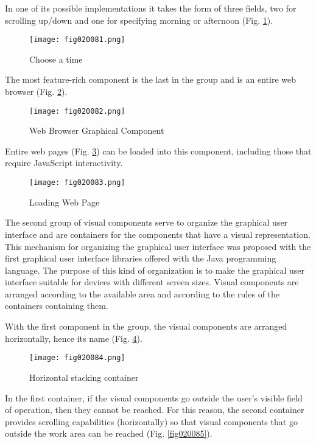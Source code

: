 In one of its possible implementations it takes the form of three fields, two for scrolling up/down and one for specifying morning or afternoon (Fig. \ref{fig020081}).

\begin{figure}[H]
   \centering
   \texttt{[image: fig020081.png]}
   \caption{Choose a time}
\label{fig020081}
\end{figure}

The most feature-rich component is the last in the group and is an entire web browser (Fig. \ref{fig020082}).

\begin{figure}[H]
   \centering
   \texttt{[image: fig020082.png]}
   \caption{Web Browser Graphical Component}
\label{fig020082}
\end{figure}

Entire web pages (Fig. \ref{fig020083}) can be loaded into this component, including those that require JavaScript interactivity.

\begin{figure}[H]
   \centering
   \texttt{[image: fig020083.png]}
   \caption{Loading Web Page}
\label{fig020083}
\end{figure}

The second group of visual components serve to organize the graphical user interface and are containers for the components that have a visual representation. This mechanism for organizing the graphical user interface was proposed with the first graphical user interface libraries offered with the Java programming language. The purpose of this kind of organization is to make the graphical user interface suitable for devices with different screen sizes. Visual components are arranged according to the available area and according to the rules of the containers containing them.

With the first component in the group, the visual components are arranged horizontally, hence its name (Fig. \ref{fig020084}).

\begin{figure}[H]
   \centering
   \texttt{[image: fig020084.png]}
   \caption{Horizontal stacking container}
\label{fig020084}
\end{figure}

In the first container, if the visual components go outside the user's visible field of operation, then they cannot be reached. For this reason, the second container provides scrolling capabilities (horizontally) so that visual components that go outside the work area can be reached (Fig. \ref{fig020085}).


